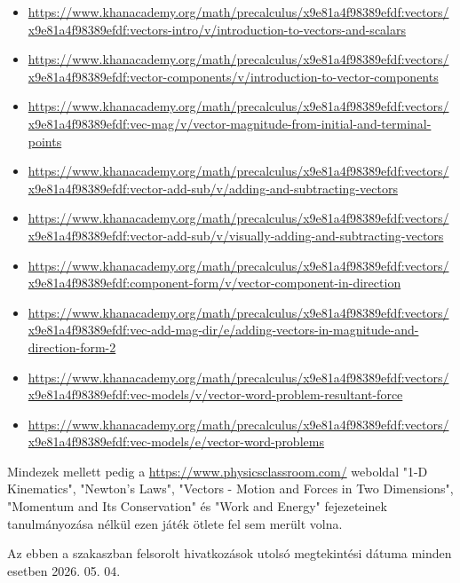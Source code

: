 \documentclass[12pt]{report}
\begin{document}
\begin{itemize}[left=0pt, topsep=0pt]
    \item \url{https://www.khanacademy.org/math/precalculus/x9e81a4f98389efdf:vectors/x9e81a4f98389efdf:vectors-intro/v/introduction-to-vectors-and-scalars}
    \item \url{https://www.khanacademy.org/math/precalculus/x9e81a4f98389efdf:vectors/x9e81a4f98389efdf:vector-components/v/introduction-to-vector-components}
    \item \url{https://www.khanacademy.org/math/precalculus/x9e81a4f98389efdf:vectors/x9e81a4f98389efdf:vec-mag/v/vector-magnitude-from-initial-and-terminal-points}
    \item \url{https://www.khanacademy.org/math/precalculus/x9e81a4f98389efdf:vectors/x9e81a4f98389efdf:vector-add-sub/v/adding-and-subtracting-vectors}
    \item \url{https://www.khanacademy.org/math/precalculus/x9e81a4f98389efdf:vectors/x9e81a4f98389efdf:vector-add-sub/v/visually-adding-and-subtracting-vectors}
    \item \url{https://www.khanacademy.org/math/precalculus/x9e81a4f98389efdf:vectors/x9e81a4f98389efdf:component-form/v/vector-component-in-direction}
    \item \url{https://www.khanacademy.org/math/precalculus/x9e81a4f98389efdf:vectors/x9e81a4f98389efdf:vec-add-mag-dir/e/adding-vectors-in-magnitude-and-direction-form-2}
    \item \url{https://www.khanacademy.org/math/precalculus/x9e81a4f98389efdf:vectors/x9e81a4f98389efdf:vec-models/v/vector-word-problem-resultant-force}
    \item \url{https://www.khanacademy.org/math/precalculus/x9e81a4f98389efdf:vectors/x9e81a4f98389efdf:vec-models/e/vector-word-problems}
\end{itemize}

\noindent
Mindezek mellett pedig a \url{https://www.physicsclassroom.com/} weboldal "1-D Kinematics", "Newton's Laws", "Vectors - Motion and Forces in Two Dimensions", "Momentum and Its Conservation" és "Work and Energy" fejezeteinek tanulmányozása nélkül ezen játék ötlete fel sem merült volna.

\bigskip

\noindent
Az ebben a szakaszban felsorolt hivatkozások utolsó megtekintési dátuma minden esetben 2026. 05. 04.

\clearpage
\thispagestyle{empty}
\printbibliography[title={Irodalomjegyzék}, heading=none]
\clearpage
\end{document}
